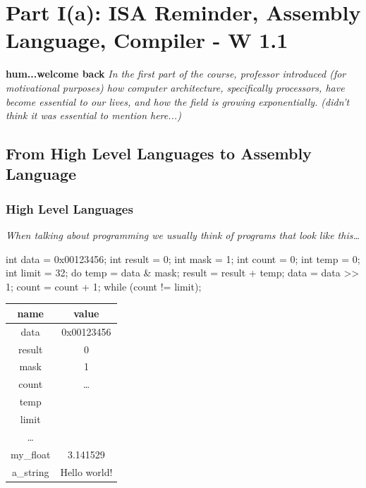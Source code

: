\chapter{Part I(a): ISA Reminder, Assembly Language, Compiler - W 1.1}
\textbf{hum...welcome back} \newline
\textit{In the first part of the course, professor introduced (for motivational purposes) how computer architecture, specifically processors, have become essential to our lives, and how the field is growing exponentially. (didn't think it was essential to mention here...)}

\section{From High Level Languages to Assembly Language}
\subsection{High Level Languages}
\textit{When talking about programming we usually think of programs that look like this\dots} \newline \vspace*{5px}

\begin{minipage}[htp]{0.4\textwidth} %
\begin{cc}
int data = 0x00123456;
int result = 0;
int mask = 1;
int count = 0;
int temp = 0;
int limit = 32;
do {
    temp = data & mask;
    result = result + temp;
    data = data >> 1;
    count = count + 1;
} while (count != limit);
\end{cc}
\end{minipage}
\hfill
\vline
\hfill
\begin{minipage}[htp]{0.4\textwidth}
    \centering
    \begin{tabular}{|c|c|}
        \hline
        \textbf{name} & \textbf{value} \\ \hline
        data       & 0x00123456  \\ \hline
        result     & 0           \\ \hline
        mask       & 1           \\ \hline
        count      & \dots       \\ \hline
        temp       &             \\ \hline
        limit      &             \\ \hline
        \dots      &             \\ \hline
        my\_float  & 3.141529    \\ \hline
        a\_string  & Hello world! \\ \hline
        \end{tabular}
\end{minipage}

